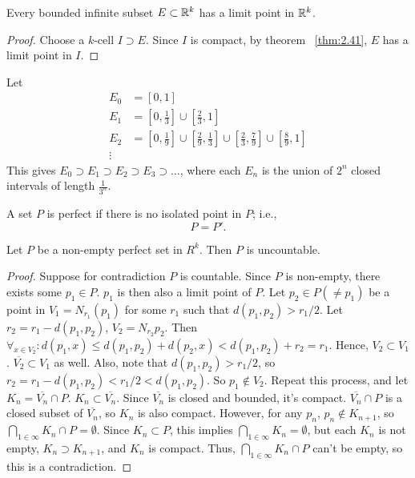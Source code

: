 \begin{thm}
	Every bounded infinite subset $E \subset \mathbb{R} ^{k}$ has a limit point in $\mathbb{R} ^{k}$.
	\begin{proof}
		Choose a $k$-cell $I \supset E$.
		Since $I$ is compact, by theorem ~\ref{thm:2.41}, $E$ has a limit point in $I$.
	\end{proof}
\end{thm}
\begin{example}
	\label{eg:2.42}
	Let
	\begin{align}
		E_0 & =[0,1]                                                                                               \\
		E_1 & =[0,\frac{1}{3}] \cup [\frac{2}{3},1]                                                                \\
		E_2 & = [0,\frac{1}{9}] \cup [\frac{2}{9},\frac{1}{3}] \cup [\frac{2}{3},\frac{7}{9}] \cup [\frac{8}{9},1] \\
		\vdots
	\end{align}
	This gives $E_0 \supset E_1 \supset E_2 \supset E_3 \supset \ldots $, where each $E_n$ is the union of $2^{n}$ closed intervals of length $\frac{1}{3^{n}}$.
\end{example}


\begin{definition}
	A set $P$ is perfect if there is no isolated point in $P$; i.e., \[
		P=P'
		.\]
\end{definition}

\begin{thm}[43]
	Let $P$ be a non-empty perfect set in $R^{k}$. Then $P$ is uncountable.
	\begin{proof}
		Suppose for contradiction $P$ is countable.
		Since $P$ is non-empty, there exists some $p_1 \in P$.
		$p_1$ is then also a limit point of $P$.
		Let $p_2 \in P(\neq p_1)$ be a point in $V_1=N_{r_1}(p_1)$ for some $r_1$ such that $d(p_1,p_2)>r_1/2$.
		Let $r_2=r_1-d(p_1,p_2)$, $V_2=N_{r_2}{p_2}$.
		Then $\forall_{x \in V_2}: d(p_1,x)\le d(p_1,p_2)+d(p_2,x)<d(p_1,p_2)+r_2=r_1$.
		Hence, $V_2 \subset V_1$.
		$\overline{V_2} \subset V_1$ as well.
		Also, note that $d(p_1,p_2)>r_1/2$, so $r_2=r_1-d(p_1,p_2)<r_1/2<d(p_1,p_2)$. So $p_1 \not\in V_2$.
		Repeat this process, and let $K_n=\overline{ V_n} \cap P$.  $K_n \subset \overline{V_n}$. Since $\overline{V_n}$ is closed and bounded, it's compact.
		$\overline{V_n} \cap P$ is a closed subset of $\overline{V_n}$, so $K_n$ is also compact.
		However, for any $p_n$, $p_n \not\in K_{n+1}$, so $\bigcap_{1 \in  \infty}K_n \cap P=\emptyset$.
		Since $K_n \subset P$, this implies $\bigcap_{1 \in  \infty}K_n=\emptyset$, but each $K_n$ is not empty, $K_n \supset K_{n+1}$, and $K_n$ is compact.
		Thus, $\bigcap_{1 \in  \infty}K_n \cap P$ can't be empty, so this is a contradiction.
	\end{proof}
\end{thm}


